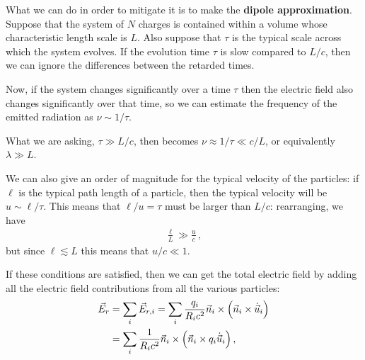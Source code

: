 \documentclass[main.tex]{subfiles}
\begin{document}
What we can do in order to mitigate it is to make the \textbf{dipole approximation}. 
Suppose that the system of \(N\) charges is contained within a volume whose characteristic length scale is \(L\). 
Also suppose that \(\tau \) is the typical scale across which the system evolves. 
If the evolution time \(\tau \) is slow compared to \(L / c\), then we can ignore the differences between the retarded times. 

Now, if the system changes significantly over a time \(\tau \) then the electric field also changes significantly over that time, so we can estimate the frequency of the emitted radiation as \(\nu \sim 1/ \tau \). 

What we are asking, \(\tau \gg L / c\), then becomes \(\nu \approx 1/\tau  \ll c/ L\), or equivalently \(\lambda \gg L\). 

We can also give an order of magnitude for the typical velocity of the particles: if \(\ell\) is the typical path length of a particle, then the typical velocity will be \(u \sim \ell / \tau \).  
This means that \(\ell / u = \tau\) must be larger than \(L / c\): rearranging, we have 
%
\begin{align}
\frac{\ell}{L} \gg \frac{u}{c}
\,,
\end{align}
%
but since \(\ell \lesssim L\) this means that \(u / c \ll 1\).

If these conditions are satisfied, then we can get the total electric field by adding all the electric field contributions from all the various particles: 
%
\begin{align}
\vec{E}_r &= \sum _{i} \vec{E}_{r, i} 
= \sum _{i} \frac{q_i}{R_i c^2} \vec{n}_i \times \qty(\vec{n}_i \times \dot{\vec{u}}_i)  \\ 
&= \sum _{i} \frac{1}{R_i c^2} \vec{n}_i \times \qty(\vec{n}_i \times q_i \dot{\vec{u}}_i) 
\,,
\end{align}
%
\end{document}
